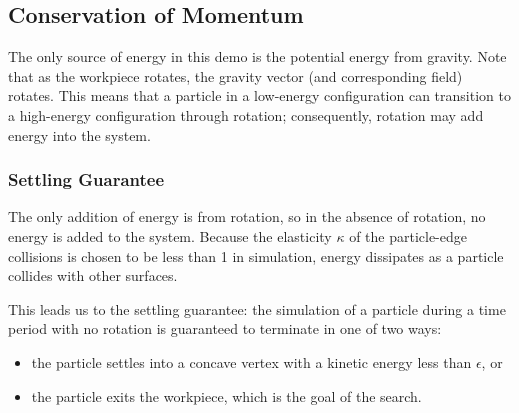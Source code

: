 





	\subsection{Conservation of Momentum}

		The only source of energy in this demo is the potential energy from gravity. Note that as the workpiece rotates, the gravity vector (and corresponding field) rotates. This means that a particle in a low-energy configuration can transition to a high-energy configuration through rotation; consequently, rotation may add energy into the system.

		\subsubsection{Settling Guarantee}

		The only addition of energy is from rotation, so in the absence of rotation, no energy is added to the system. Because the elasticity  $\kappa$ of the particle-edge collisions is chosen to be less than 1 in simulation, energy dissipates as a particle collides with other surfaces.

		This leads us to the settling guarantee: the simulation of a particle during a time period with no rotation is guaranteed to terminate in one of two ways:

\begin{itemize}
\item the particle settles into a concave vertex with a kinetic energy less than $\epsilon$, or
\item the particle exits the workpiece, which is the goal of the search.
\end{itemize}

